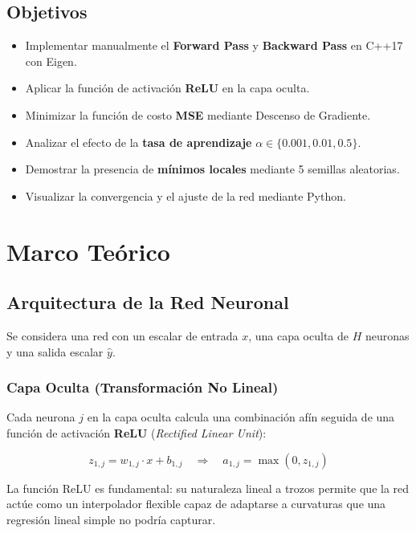 \documentclass[12pt,a4paper]{article}
\theoremstyle{definition}
\begin{document}
\subsection{Objetivos}
\begin{itemize}
    \item Implementar manualmente el \textbf{Forward Pass} y \textbf{Backward Pass} en C++17 con Eigen.
    \item Aplicar la funci\'{o}n de activaci\'{o}n \textbf{ReLU} en la capa oculta.
    \item Minimizar la funci\'{o}n de costo \textbf{MSE} mediante Descenso de Gradiente.
    \item Analizar el efecto de la \textbf{tasa de aprendizaje} $\alpha \in \{0.001, 0.01, 0.5\}$.
    \item Demostrar la presencia de \textbf{m\'{i}nimos locales} mediante 5 semillas aleatorias.
    \item Visualizar la convergencia y el ajuste de la red mediante Python.
\end{itemize}

\section{Marco Te\'{o}rico}\label{sec:teoria}

\subsection{Arquitectura de la Red Neuronal}

Se considera una red con un escalar de entrada $x$, una capa oculta de $H$ neuronas y una salida escalar $\hat{y}$.

\subsubsection{Capa Oculta (Transformaci\'{o}n No Lineal)}

Cada neurona $j$ en la capa oculta calcula una combinaci\'{o}n af\'{i}n seguida de una funci\'{o}n de activaci\'{o}n \textbf{ReLU} (\textit{Rectified Linear Unit}):

\begin{equation}\label{eq:capa_oculta}
z_{1,j} = w_{1,j} \cdot x + b_{1,j} \quad \Longrightarrow \quad a_{1,j} = \max(0, z_{1,j})
\end{equation}

La funci\'{o}n ReLU es fundamental: su naturaleza lineal a trozos permite que la red act\'{u}e como un interpolador flexible capaz de adaptarse a curvaturas que una regresi\'{o}n lineal simple no podr\'{i}a capturar.
\end{document}
